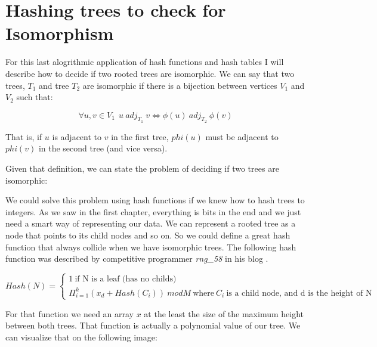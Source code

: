 \medskip

\section{Hashing trees to check for Isomorphism}

For this last alogrithmic application of hash functions and hash tables I will describe how to decide if two rooted trees are isomorphic. We can say that two trees,  \( T_1 \) and tree \( T_2 \) are isomorphic if there is a bijection between vertices \(V_1 \) and \(V_2 \) such that:

\[ \forall u, v \in V_1~ ~ u ~adj_{T_1} ~v \iff \phi(u) ~adj_{T_2} ~\phi(v) \]

That is, if \(u \) is adjacent to \( v \) in the first tree, \( phi(u) \) must be adjacent to \( phi(v) \) in the second tree (and vice versa).

Given that definition, we can state the problem of deciding if two trees are isomorphic:

\medskip


\medskip

We could solve this problem using hash functions if we knew how to hash trees to integers. As we saw in the first chapter, everything is bits in the end and we just need a smart way of representing our data. We can represent a rooted tree as a node that points to its child nodes and so on. So we could define a great hash function that always collide when we have isomorphic trees. The following hash function was described by competitive programmer \textit{rng\_58} in his blog \cite{TreeIsomorphism}.


\[ Hash(N) = \begin{cases} 1 ~\text{if N is a leaf (has no childs)} \\
    \Pi_{i = 1}^{k} (x_d + Hash(C_i)) ~mod M ~\text{where} ~C_i ~\text{is a child node, and d is the height of N}
  \end{cases} \]

For that function we need an array \( x \) at the least the size of the maximum height between both trees. That function is actually a polynomial value of our tree. We can visualize that on the following image:

